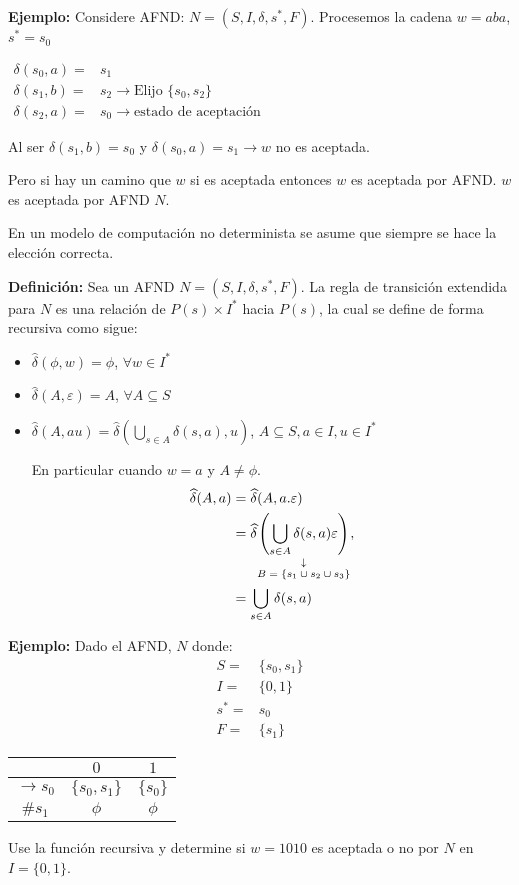 \textbf{Ejemplo: }Considere AFND: $N=(S,I,\delta,s^*,F)$. Procesemos la cadena $w=aba$, $s^*=s_0$

\begin{center}
$\begin{array}{cl}
\delta(s_0,a)=	&s_1	\\
\delta(s_1,b)=	&s_2 \rightarrow \mbox{Elijo }\{s_0,s_2\}	\\
\delta(s_2,a)=	&s_0 \rightarrow \mbox{estado de aceptación}
\end{array}$
\end{center}

Al ser $\delta(s_1,b)=s_0$ y $\delta(s_0,a)=s_1 \rightarrow w$ no es aceptada.

Pero si hay un camino que $w$ si es aceptada entonces $w$ es aceptada por AFND. $w$ es aceptada por AFND $N$.

En un modelo de computación no determinista se asume que siempre se hace la elección correcta.

\textbf{Definición: }Sea un AFND $N=(S,I,\delta,s^*,F)$. La regla de transición extendida para $N$ es una relación de $P(s)\times I^*$ hacia $P(s)$, la cual se define de forma recursiva como sigue:

\begin{itemize}
\item $\widehat{\delta}(\phi,w)=\phi$, $\forall w\in I^*$
\item $\widehat{\delta}(A,\varepsilon)=A$,  $\forall A\subseteq S$
\item $\widehat{\delta}(A,au)=\widehat{\delta}\left(\bigcup_{s\in A}\delta(s,a),u\right)$,  $A\subseteq S, a\in I, u\in I^*$

En particular cuando $w=a$ y $A\not= \phi$.
\begin{align*}
\widehat{\delta}(A,a)&=\widehat{\delta}(A,a.\varepsilon)	\\
	&=\widehat{\delta}\downlegend{\left(\bigcup_{s\in A}\delta(s,a)\varepsilon\right)}{$B=\{s_1\cup s_2\cup s_3\}$}, \\
	&=\bigcup_{s\in A}\delta(s,a)
\end{align*}
\end{itemize}

\textbf{Ejemplo: }Dado el AFND, $N$ donde:
\begin{align*}
S=&\{s_0,s_1\}	\\
I=&\{0,1\}	\\
s^*=&s_0	\\
F=&\{s_1\}
\end{align*}
\begin{center}
\begin{tabular}{c|cc}
	&$0$	&$1$	\\ \hline
$\rightarrow s_0$	&$\{s_0,s_1\}$	&$\{s_0\}$	\\
$\#s_1$	&$\phi$		&$\phi$
\end{tabular}
\end{center}
Use la función recursiva y determine si $w=1010$ es aceptada o no por $N$ en $I=\{0,1\}$.

